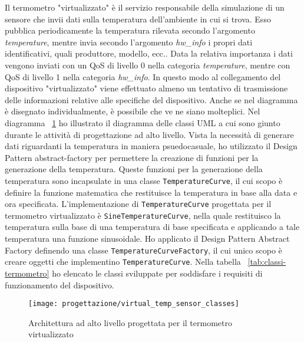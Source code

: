 Il termometro "virtualizzato" è il servizio responsabile della simulazione di un sensore che invii dati sulla temperatura dell'ambiente in cui si trova.
Esso pubblica periodicamente la temperatura rilevata secondo l'argomento \emph{temperature}, mentre invia secondo l'argomento \emph{hw\_info} i propri dati identificativi, quali produttore, modello, ecc..
Data la relativa importanza i dati vengono inviati con un QoS di livello 0 nella categoria \emph{temperature}, mentre con QoS di livello 1 nella categoria \emph{hw\_info}.
In questo modo al collegamento del dispositivo "virtualizzato" viene effettuato almeno un tentativo di trasmissione delle informazioni relative alle specifiche del dispositivo.
Anche se nel diagramma è disegnato individualmente, è possibile che ve ne siano molteplici.
Nel diagramma ~\ref{fig:classi-termometro} ho illustrato il diagramma delle classi UML a cui sono giunto durante le attività di progettazione ad alto livello. Vista la necessità di generare dati riguardanti la temperatura in maniera psuedocasuale, ho utilizzato il Design Pattern \gls{abstract-factory} per permettere la creazione di funzioni per la generazione della temperatura. Queste funzioni per la generazione della temperatura sono incapsulate in una classe \texttt{TemperatureCurve}, il cui scopo è definire la funzione matematica che restituisce la temperatura in base alla data e ora specificata. L'implementazione di \texttt{TemperatureCurve} progettata per il termometro virtualizzato è \texttt{SineTemperatureCurve}, nella quale restituisco la temperatura sulla base di una temperatura di base specificata e applicando a tale temperatura una funzione sinusoidale.
Ho applicato il Design Pattern Abstract Factory definendo una classe \texttt{TemperatureCurveFactory}, il cui unico scopo è creare oggetti che implementino \texttt{TemperatureCurve}.
Nella tabella ~\ref{tab:classi-termometro} ho elencato le classi sviluppate per soddisfare i requisiti di funzionamento del dispositivo.

\begin{figure}[!h]
    \centering
    \texttt{[image: progettazione/virtual\_temp\_sensor\_classes]}
    \caption{Architettura ad alto livello progettata per il termometro virtualizzato}
    \label{fig:classi-termometro}
\end{figure}

